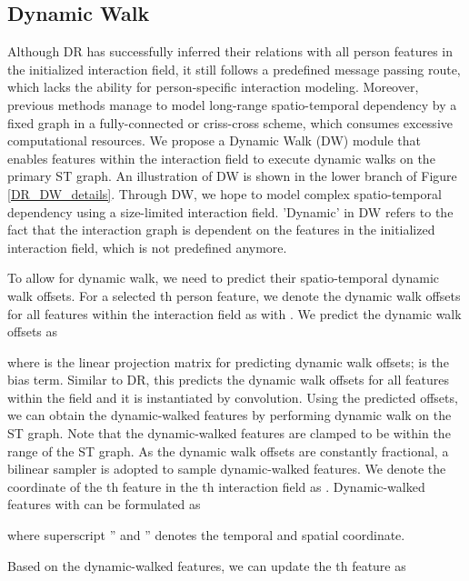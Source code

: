 \documentclass[10pt,twocolumn,letterpaper]{article}
\begin{document}
\subsection{Dynamic Walk} \label{DW}


Although DR has successfully inferred their relations with all person features in the initialized interaction field, it still follows a predefined message passing route, which lacks the ability for person-specific interaction modeling. Moreover, previous methods manage to model long-range spatio-temporal dependency by a fixed graph in a fully-connected or criss-cross scheme, which consumes excessive computational resources. We propose a Dynamic Walk (DW) module that enables features within the interaction field to execute dynamic walks on the primary ST graph. An illustration of DW is shown in the lower branch of Figure \ref{DR_DW_details}. Through DW, we hope to model complex spatio-temporal dependency using a size-limited interaction field. 'Dynamic' in DW refers to the fact that the interaction graph is dependent on the features in the initialized interaction field, which is not predefined anymore. 



To allow for dynamic walk, we need to predict their spatio-temporal dynamic walk offsets. For a selected th person feature, we denote the dynamic walk offsets for all features within the interaction field as  with . We predict the dynamic walk offsets as 

where  is the linear projection matrix for predicting dynamic walk offsets;  is the bias term. Similar to DR, this predicts the dynamic walk offsets for all features within the field and it is instantiated by convolution. Using the predicted offsets, we can obtain the dynamic-walked features by performing dynamic walk on the ST graph. Note that the dynamic-walked features are clamped to be within the range of the ST graph. As the dynamic walk offsets are constantly fractional, a bilinear sampler \cite{jaderberg2015spatialtransformer} is adopted to sample dynamic-walked features. We denote the coordinate of the th feature in the th interaction field as . Dynamic-walked features  with  can be formulated as

\vspace{-0.5cm}

where superscript '' and '' denotes the temporal and spatial coordinate. 


Based on the dynamic-walked features, we can update the th feature as
\end{document}

